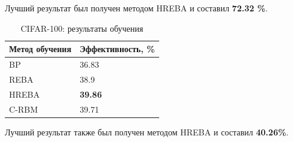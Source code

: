 Лучший результат был получен методом HREBA и составил \textbf{72.32 \%}.

\begin{table} [!h]
  \centering
  \caption{CIFAR-100: результаты обучения}\label{table:cifar_100_results}
  \begin{tabular}{| p{6cm} | p{6cm} |}
    \hline
      \textbf{Метод обучения} & \textbf{Эффективность, \%}\\
      \hline
      BP & 36.83\\
      \hline
      REBA & 38.9\\
      \hline
      HREBA & \textbf{39.86}\\
      \hline
      C-RBM & 39.71\\
      \hline
  \end{tabular}
\end{table}

Лучший результат также был получен методом HREBA и составил \textbf{40.26\%}.





